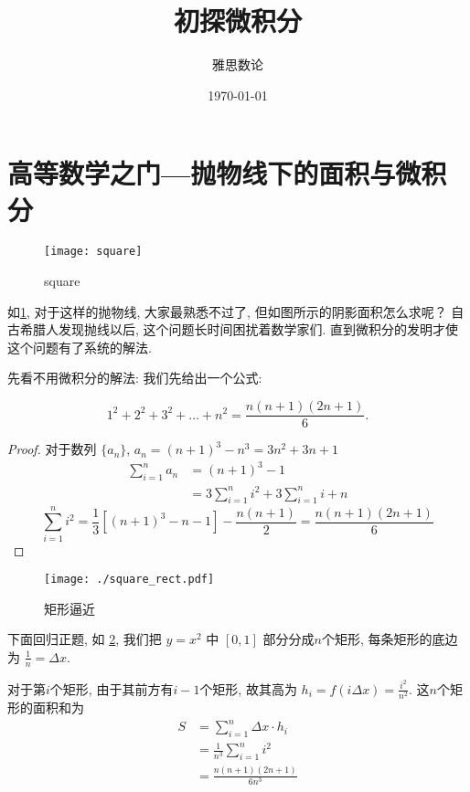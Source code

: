 \documentclass[UTF8]{mathrep}
\title{初探微积分}
\date{\today}
\author{雅思数论}
\begin{document}
\maketitle
\tableofcontents

\section{高等数学之门---抛物线下的面积与微积分}

\begin{figure}
  \begin{center}
    \texttt{[image: square]}
  \end{center}
  \caption{square}\label{fig:square}
\end{figure}

如\cref{fig:square}, 对于这样的抛物线, 大家最熟悉不过了, 但如图所示的阴影面积怎么求呢？
自古希腊人发现抛线以后, 这个问题长时间困扰着数学家们.
直到微积分的发明才使这个问题有了系统的解法.

先看不用微积分的解法:
我们先给出一个公式:

\[
  1^{2}+2^{2}+3^{2}+\ldots + n^{2} = \frac{n(n+1)(2n+1)}{6}
.\]

\begin{proof}
  对于数列 $\{a_{n}\} $, $a_n = (n+1)^{3}- n ^{3} = 3n^{2}+3n+1$
  \begin{align}
    \sum_{i=1}^{n} a_n & = (n+1)^{3}-1                                     \\
    & = 3 \sum_{i=1}^{n} i^{2} + 3 \sum_{i=1}^{n} i + n
  \end{align}
  \begin{equation*}
    \sum_{i=1}^{n} i^{2} = \frac{1}{3} \left[(n+1)^{3} -n -1 \right]
    - \frac{n(n+1)}{2}  = \frac{n(n+1)(2n+1)}{6}
  \end{equation*}
\end{proof}

\begin{figure}
  \begin{center}
    \texttt{[image: ./square\_rect.pdf]}
  \end{center}
  \caption{矩形逼近} \label{fig:rect}
\end{figure}

下面回归正题,
如 \cref{fig:rect}, 我们把 $y=x^{2} $ 中 $[0, 1]$ 部分分成$n$个矩形,
每条矩形的底边为 $ \frac{1}{n} = \Delta x $.

对于第$i$个矩形, 由于其前方有$i-1$个矩形,
故其高为 $h_i = f(i \Delta x) = \frac{i^{2}}{n^{2} } $.
这$n$个矩形的面积和为
\begin{align*}
  S & = \sum_{i=1}^{n} \Delta x \cdot h_i  \\
  & = \frac{1}{n^3} \sum_{i=1}^{n} i^{2} \\
  & = \frac{n(n+1)(2n+1)}{6n^3 }
\end{align*}
\end{document}
